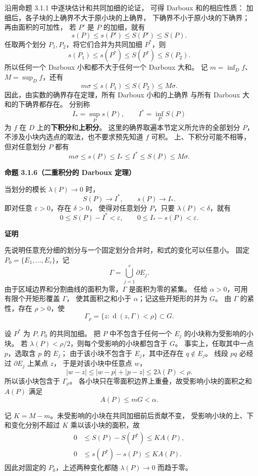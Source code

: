 沿用命题 3.1.1 中逐块估计和共同加细的论证，
可得 Darboux 和的相应性质：
加细后，各子块的上确界不大于原小块的上确界，
下确界不小于原小块的下确界；再由面积的可加性，
若 $P'$ 是 $P$ 的加细，就有
\[
s(P)\le s(P')\le S(P')\le S(P).
\]
任取两个划分 $P_1,P_2$，将它们合并为共同加细 $P^*$，则
\[
s(P_1)\le s(P^*)\le S(P^*)\le S(P_2).
\]
所以任何一个 Darboux 小和都不大于任何一个 Darboux 大和。
记 $m=\inf_D f$、$M=\sup_D f$，还有
\[
m\sigma\le s(P_1)\le S(P_2)\le M\sigma.
\]
因此，由实数的确界存在定理，所有 Darboux 小和的上确界
与所有 Darboux 大和的下确界都存在。
分别称
\[
I_*=\sup_P s(P),\qquad I^*=\inf_P S(P)
\]
为 $f$ 在 $D$ 上的\textbf{下积分}和\textbf{上积分}。
这里的确界取遍本节定义所允许的全部划分 $P$，
不涉及小块内选点的取法，也不要求预先知道 $f$ 可积。
上、下积分可能不相等，但对任意划分 $P$ 都有
\[
m\sigma\le s(P)\le I_*\le I^*\le S(P)\le M\sigma.
\]




\textbf{命题 3.1.6（二重积分的 Darboux 定理）}


当划分的模长 $\lambda(P)\to0$ 时，
\[
S(P)\to I^*,\qquad s(P)\to I_*.
\]
即对任意 $\varepsilon>0$，存在 $\delta>0$，
使得对任意划分 $P$，只要 $\lambda(P)<\delta$，就有
\[
0\le S(P)-I^*<\varepsilon,\qquad
0\le I_*-s(P)<\varepsilon.
\]





\textbf{证明}

先说明任意充分细的划分与一个固定划分合并时，和式的变化可以任意小。
固定 $P_0=\{E_1,\ldots,E_r\}$，记
\[
\Gamma=\bigcup_{j=1}^r\partial E_j.
\]
由于区域边界和分割曲线的面积为零，$\Gamma$ 是面积为零的紧集。
任给 $\alpha>0$，可用有限个开矩形覆盖 $\Gamma$，
使其面积之和小于 $\alpha$；记这些开矩形的并为 $G$。
由 $\Gamma$ 的紧性，存在 $\rho>0$，使
\[
\Gamma_\rho=\{z:\operatorname{d}(z,\Gamma)<\rho\}\subset G.
\]

设 $P^*$ 为 $P,P_0$ 的共同加细。
把 $P$ 中不包含于任何一个 $E_j$ 的小块称为受影响的小块。
若 $\lambda(P)<\rho/2$，则每个受影响的小块都包含于 $G$。
事实上，任取其中一点 $p$，选取含 $p$ 的 $E_j$；
由于该小块不包含于 $E_j$，其中还存在 $q\notin E_j$。
线段 $pq$ 必经过 $\partial E_j$ 上某点 $z$，
于是对该小块中任意点 $w$，
\[
|w-z|\le |w-p|+|p-z|
\le 2\lambda(P)<\rho.
\]
所以该小块包含于 $\Gamma_\rho$。
各小块只在零面积边界上重叠，故受影响小块的面积之和 $A(P)$ 满足
\[
A(P)\le mG<\alpha.
\]

记 $K=M-m$。未受影响的小块在共同加细前后贡献不变，
受影响小块的上、下和变化分别不超过 $K$ 乘以该小块的面积，故
\[
\begin{aligned}
0&\le S(P)-S(P^*)\le K A(P),\\
0&\le s(P^*)-s(P)\le K A(P).
\end{aligned}
\]
因此对固定的 $P_0$，上述两种变化都随 $\lambda(P)\to0$ 而趋于零。

